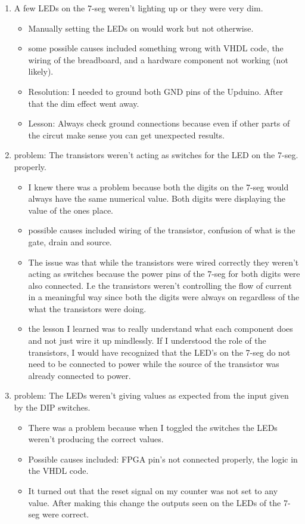 \documentclass[12pt]{article}
\begin{document}
\begin{flushleft}
\begin{enumerate}
    \item A few LEDs on the 7-seg weren't lighting up or they were very dim.
    \begin{itemize} 
        \item Manually setting the LEDs on would work but not otherwise. 
        \item some possible causes included something wrong with VHDL code, the
wiring of the breadboard, and a hardware component not working (not likely). 
        \item Resolution: I needed to ground both GND pins of the Upduino. After
that the dim effect went away. 
        \item Lesson: Always check ground connections because even if other
parts of the circut make sense you can get unexpected results. 
    \end{itemize}
    \item problem: The transistors weren't acting as switches for the LED on the
7-seg. properly. 
    \begin{itemize}
        \item I knew there was a problem because both the digits on the 7-seg
would always have the same numerical value. Both digits were displaying the
value of the ones place. 
        \item possible causes included wiring of the transistor, confusion of
what is the gate, drain and source. 
        \item The issue was that while the transistors were wired correctly they
weren't acting as switches because the power pins of the 7-seg for both digits
were also connected. I.e the transistors weren't controlling the flow of current
in a meaningful way since both the digits were always on regardless of the what
the transistors were doing. 
        \item the lesson I learned was to really understand what each component
does and not just wire it up mindlessly. If I understood the role of the
transistors, I would have recognized that the LED's on the 7-seg do not need to
be connected to power while the source of the transistor was already connected
to power. 
    \end{itemize}
    \item problem: The LEDs weren't giving values as expected from the input
given by the DIP switches. 
        \begin{itemize}
            \item There was a problem because when I toggled the switches the
LEDs weren't producing the correct values. 
            \item Possible causes included: FPGA pin's not connected properly,
the logic in the VHDL code. 
            \item It turned out that the reset signal on my counter was not set
to any value. After making this change the outputs seen on the LEDs of the 7-seg
were correct. 
        \end{itemize}


\end{enumerate}
\end{flushleft}
\end{document}

